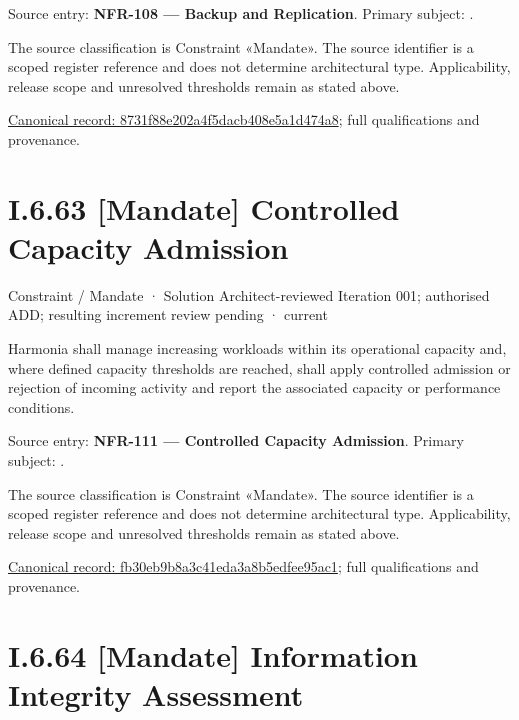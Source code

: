 Source entry: \textbf{NFR-108 — Backup and Replication}. Primary subject: \texttt{}.



The source classification is Constraint «Mandate». The source identifier is a scoped register reference and does not determine architectural type. Applicability, release scope and unresolved thresholds remain as stated above.


{\footnotesize \href{../../../../../../../../continuum/motivation/constraint/mandate/8731f88e202a4f5dacb408e5a1d474a8.md}{Canonical record: 8731f88e202a4f5dacb408e5a1d474a8}; full qualifications and provenance.}\par
\section*{I.6.63 [Mandate] Controlled Capacity Admission}
\label{navigation:I.6.63}

\label{element:fb30eb9b8a3c41eda3a8b5edfee95ac1}
{\small Constraint / Mandate · Solution Architect-reviewed Iteration 001; authorised ADD; resulting increment review pending · current}\par

Harmonia shall manage increasing workloads within its operational capacity and, where defined capacity thresholds are reached, shall apply controlled admission or rejection of incoming activity and report the associated capacity or performance conditions.



Source entry: \textbf{NFR-111 — Controlled Capacity Admission}. Primary subject: \texttt{}.



The source classification is Constraint «Mandate». The source identifier is a scoped register reference and does not determine architectural type. Applicability, release scope and unresolved thresholds remain as stated above.


{\footnotesize \href{../../../../../../../../continuum/motivation/constraint/mandate/fb30eb9b8a3c41eda3a8b5edfee95ac1.md}{Canonical record: fb30eb9b8a3c41eda3a8b5edfee95ac1}; full qualifications and provenance.}\par
\section*{I.6.64 [Mandate] Information Integrity Assessment}
\label{navigation:I.6.64}

